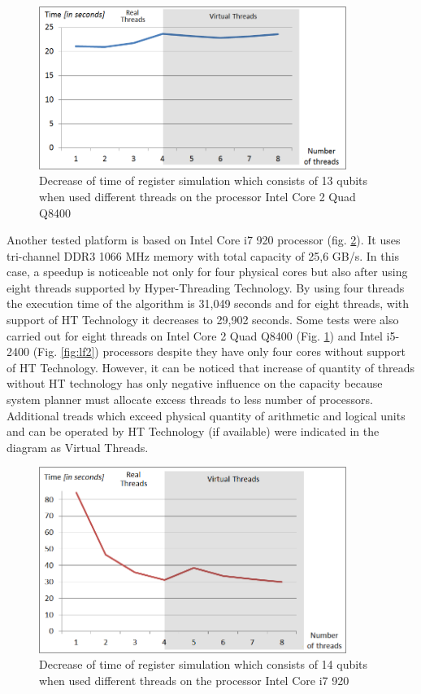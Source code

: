 \documentclass[10pt, a5paper]{article}
\begin{document}
\begin{figure}
  \centering
  \includegraphics[width=10cm]{18_2012_5b.png}
  \caption{Decrease of time of register simulation which consists of 13 qubits when used different threads on the processor Intel Core 2 Quad Q8400}
  \label{fig:lf5}
\end{figure}

Another tested platform is based on Intel Core i7 920 processor (fig. \ref{fig:lf4}). It uses tri-channel DDR3 1066 MHz memory with total capacity of 25,6 GB/s. In this case, a speedup is noticeable not only for four physical cores but also after using eight threads supported by Hyper-Threading Technology. By using four threads the execution time of the algorithm is 31,049 seconds and for eight threads, with support of HT Technology it decreases to 29,902 seconds. Some tests were also carried out for eight threads on Intel Core 2 Quad Q8400 (Fig. \ref{fig:lf5}) and Intel i5-2400 (Fig. \ref{fig:lf2}) processors despite they have only four cores without support of HT Technology. However, it can be noticed that increase of quantity of threads without HT technology has only negative influence on the capacity because system planner must allocate excess threads to less number of processors. Additional treads which exceed physical quantity of arithmetic and logical units and can be operated by HT Technology (if available) were indicated in the diagram as Virtual Threads.

\begin{figure}
  \centering
  \includegraphics[width=10cm]{18_2012_4b.png}
  \caption{Decrease of time of register simulation which consists of 14 qubits when used different threads on the processor Intel Core i7 920}
  \label{fig:lf4}
\end{figure}
\end{document}
